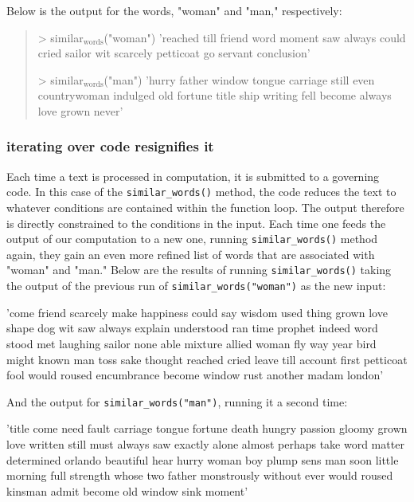 \documentclass[11pt]{article}
\begin{document}
Below is the output for the words, "woman" and "man," respectively:

\begin{quote}
> similar\(_{\text{words}}\)("woman")
'reached till friend word moment saw always could cried sailor wit
scarcely petticoat go servant conclusion'

> similar\(_{\text{words}}\)("man") 
'hurry father window tongue carriage still even countrywoman indulged
old fortune title ship writing fell become always love grown never'
\end{quote}

\subsubsection{iterating over code resignifies it}
\label{sec:org3efd3af}
Each time a text is processed in computation, it is submitted to a
governing code. In this case of the \texttt{similar\_words()} method, the code
reduces the text to whatever conditions are contained within the
function loop. The output therefore is directly constrained to the
conditions in the input. Each time one feeds the output of our
computation to a new one, running \texttt{similar\_words()} method again, they
gain an even more refined list of words that are associated with
"woman" and "man."  Below are the results of running \texttt{similar\_words()}
taking the output of the previous run of \texttt{similar\_words("woman")} as
the new input:

\begin{SOURCE}
'come friend scarcely make happiness could say wisdom used thing grown
love shape dog wit saw always explain understood ran time prophet
indeed word stood met laughing sailor none able mixture allied woman
fly way year bird might known man toss sake thought reached cried
leave till account first petticoat fool would roused encumbrance
become window rust another madam london'
\end{SOURCE}

And the output for \texttt{similar\_words("man")}, running it a second time:

\begin{SOURCE}
'title come need fault carriage tongue fortune death hungry passion
gloomy grown love written still must always saw exactly alone almost
perhaps take word matter determined orlando beautiful hear hurry woman
boy plump sens man soon little morning full strength whose two father
monstrously without ever would roused kinsman admit become old window
sink moment'
\end{SOURCE}
\end{document}
